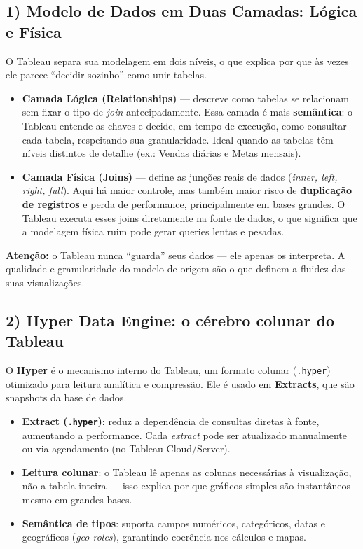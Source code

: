 \subsection*{1) Modelo de Dados em Duas Camadas: Lógica e Física}
O Tableau separa sua modelagem em dois níveis, o que explica por que às vezes ele parece “decidir sozinho” como unir tabelas.

\begin{itemize}[leftmargin=*]
  \item \textbf{Camada Lógica (Relationships)} — descreve como tabelas se relacionam sem fixar o tipo de \textit{join} antecipadamente.  
  Essa camada é mais \textbf{semântica}: o Tableau entende as chaves e decide, em tempo de execução, como consultar cada tabela, respeitando sua granularidade.  
  Ideal quando as tabelas têm níveis distintos de detalhe (ex.: Vendas diárias e Metas mensais).

  \item \textbf{Camada Física (Joins)} — define as junções reais de dados (\textit{inner, left, right, full}).  
  Aqui há maior controle, mas também maior risco de \textbf{duplicação de registros} e perda de performance, principalmente em bases grandes.  
  O Tableau executa esses joins diretamente na fonte de dados, o que significa que a modelagem física ruim pode gerar queries lentas e pesadas.
\end{itemize}

\begin{NoteBox}
\textbf{Atenção:} o Tableau nunca “guarda” seus dados — ele apenas os interpreta.  
A qualidade e granularidade do modelo de origem são o que definem a fluidez das suas visualizações.
\end{NoteBox}

\subsection*{2) Hyper Data Engine: o cérebro colunar do Tableau}
O \textbf{Hyper} é o mecanismo interno do Tableau, um formato colunar (\texttt{.hyper}) otimizado para leitura analítica e compressão.  
Ele é usado em \textbf{Extracts}, que são snapshots da base de dados.

\begin{itemize}[leftmargin=*]
  \item \textbf{Extract (\texttt{.hyper})}: reduz a dependência de consultas diretas à fonte, aumentando a performance.  
  Cada \textit{extract} pode ser atualizado manualmente ou via agendamento (no Tableau Cloud/Server).  
  \item \textbf{Leitura colunar}: o Tableau lê apenas as colunas necessárias à visualização, não a tabela inteira — isso explica por que gráficos simples são instantâneos mesmo em grandes bases.
  \item \textbf{Semântica de tipos}: suporta campos numéricos, categóricos, datas e geográficos (\textit{geo-roles}), garantindo coerência nos cálculos e mapas.
\end{itemize}

